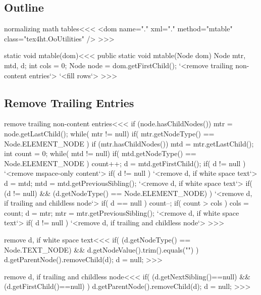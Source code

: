 \documentclass{article}
\begin{document}
\subsection{Outline}

\<normalizing math tables\><<<
<dom name="." xml="." method="mtable" class="tex4ht.OoUtilities" />
>>>


\<static void mtable(dom)\><<<
public static void mtable(Node dom) {
      Node mtr, mtd, d;
      int cols = 0;
  Node node = dom.getFirstChild();
   `<remove trailing non-content entries`>
   `<fill rows`>
}
>>>


 




\subsection{Remove Trailing Entries}

\<remove trailing non-content entries\><<<
if (node.hasChildNodes()) {
   mtr = node.getLastChild();
   while( mtr != null){
      if( mtr.getNodeType() == Node.ELEMENT_NODE ){
         if (mtr.hasChildNodes()) {
           mtd = mtr.getLastChild();            
           int count = 0;
           while( mtd != null){
             if( mtd.getNodeType() == Node.ELEMENT_NODE ){
                count++;
                d = mtd.getFirstChild();                
                if( d != null ){  
                   `<remove mspace-only content`>
                }
                if( d != null ){  
                   `<remove d, if white space text`>         
             }  }
             d = mtd;
             mtd = mtd.getPreviousSibling();
             `<remove d, if white space text`>
             if( (d != null) 
                  && (d.getNodeType() == Node.ELEMENT_NODE) ){
               `<remove d, if trailing and childless node`>
               if( d == null ){ count--; }
           } } 
           if( count > cols ){ cols = count; }
      } }  
      d = mtr;
      mtr = mtr.getPreviousSibling();
      `<remove d, if white space text`>         
      if( d != null ){
         `<remove d, if trailing and childless node`>
}  }  }
>>>


\<remove d, if white space text\><<<
if( 
    (d.getNodeType() == Node.TEXT_NODE)
    && d.getNodeValue().trim().equals("")
){
    d.getParentNode().removeChild(d); 
    d = null;
}
>>>

\<remove d, if trailing and childless node\><<<
if( (d.getNextSibling()==null) 
    && (d.getFirstChild()==null)  ){
   d.getParentNode().removeChild(d); 
   d = null;
}
>>>
\end{document}
